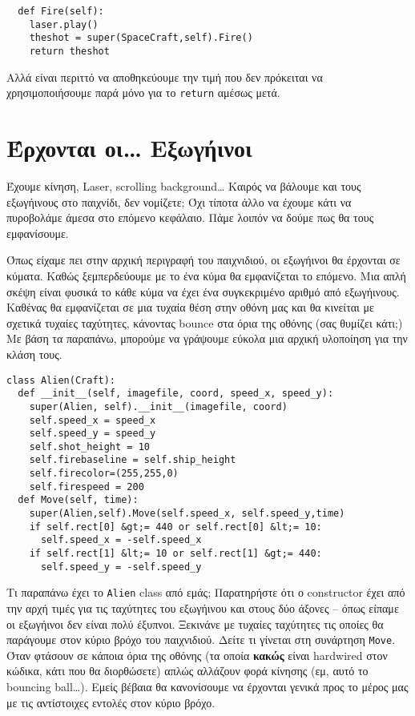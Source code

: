\begin{verbatim}
  def Fire(self):
    laser.play()
    theshot = super(SpaceCraft,self).Fire()
    return theshot
\end{verbatim}

Αλλά είναι περιττό να αποθηκεύουμε την τιμή που δεν πρόκειται να χρησιμοποιήσουμε παρά μόνο για το {\tt return} αμέσως μετά.

\section{Έρχονται οι\ldots{} Εξωγήινοι}

Έχουμε κίνηση, Laser, scrolling background\ldots{} Καιρός να βάλουμε και τους εξωγήινους στο παιχνίδι, δεν νομίζετε; Όχι τίποτα άλλο να έχουμε κάτι να πυροβολάμε άμεσα στο επόμενο κεφάλαιο. Πάμε λοιπόν να δούμε πως θα τους εμφανίσουμε.

Όπως είχαμε πει στην αρχική περιγραφή του παιχνιδιού, οι εξωγήινοι θα έρχονται σε κύματα. Καθώς ξεμπερδεύουμε με το ένα κύμα θα εμφανίζεται το επόμενο. Μια απλή σκέψη είναι φυσικά το κάθε κύμα να έχει ένα συγκεκριμένο αριθμό από εξωγήινους. Καθένας θα εμφανίζεται σε μια τυχαία θέση στην οθόνη μας και θα κινείται με σχετικά τυχαίες ταχύτητες, κάνοντας bounce στα όρια της οθόνης (σας θυμίζει κάτι;) Με βάση τα παραπάνω, μπορούμε να γράψουμε εύκολα μια αρχική υλοποίηση για την κλάση τους.

\begin{verbatim}
class Alien(Craft):
  def __init__(self, imagefile, coord, speed_x, speed_y):
    super(Alien, self).__init__(imagefile, coord)
    self.speed_x = speed_x
    self.speed_y = speed_y
    self.shot_height = 10
    self.firebaseline = self.ship_height
    self.firecolor=(255,255,0)
    self.firespeed = 200
  def Move(self, time):
    super(Alien,self).Move(self.speed_x, self.speed_y,time)
    if self.rect[0] &gt;= 440 or self.rect[0] &lt;= 10:
      self.speed_x = -self.speed_x
    if self.rect[1] &lt;= 10 or self.rect[1] &gt;= 440:
      self.speed_y = -self.speed_y
\end{verbatim}

Τι παραπάνω έχει το {\tt Alien} class από εμάς; Παρατηρήστε ότι ο constructor έχει από την αρχή τιμές για τις ταχύτητες του εξωγήινου και στους δύο άξονες -- όπως είπαμε οι εξωγήινοι δεν είναι πολύ έξυπνοι. Ξεκινάνε με τυχαίες ταχύτητες τις οποίες θα παράγουμε στον κύριο βρόχο του παιχνιδιού. Δείτε τι γίνεται στη συνάρτηση {\tt Move}. Όταν φτάσουν σε κάποια όρια της οθόνης (τα οποία {\bf κακώς} είναι hardwired στον κώδικα, κάτι που θα διορθώσετε) απλώς αλλάζουν φορά κίνησης (εμ, αυτό το bouncing ball\ldots{}). Εμείς βέβαια θα κανονίσουμε να έρχονται γενικά προς το μέρος μας με τις αντίστοιχες εντολές στον κύριο βρόχο.

